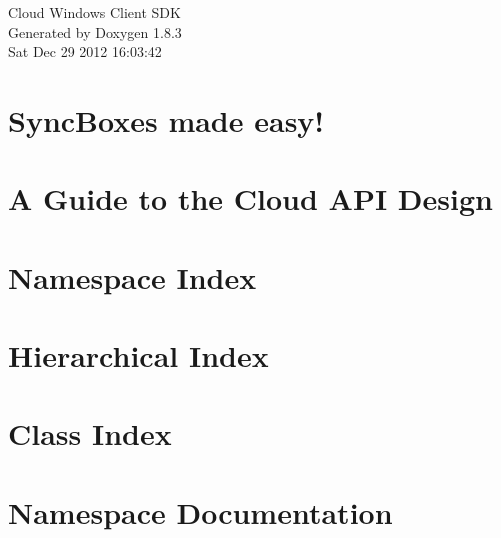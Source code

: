 \documentclass{book}
\begin{document}
\hypersetup{pageanchor=false,citecolor=blue}
\begin{titlepage}
\vspace*{7cm}
\begin{center}
{\Large Cloud Windows Client S\-D\-K }\\
\vspace*{1cm}
{\large Generated by Doxygen 1.8.3}\\
\vspace*{0.5cm}
{\small Sat Dec 29 2012 16:03:42}\\
\end{center}
\end{titlepage}
\clearemptydoublepage
{}
\tableofcontents
\clearemptydoublepage
{}
\hypersetup{pageanchor=true,citecolor=blue}
\chapter{Sync\-Boxes made easy!}
\label{index}\hypertarget{index}{}
\chapter{A Guide to the Cloud A\-P\-I Design}
\label{DevOnlyPage1}
\hypertarget{DevOnlyPage1}{}

\chapter{Namespace Index}

\chapter{Hierarchical Index}

\chapter{Class Index}

\chapter{Namespace Documentation}





















\end{document}
